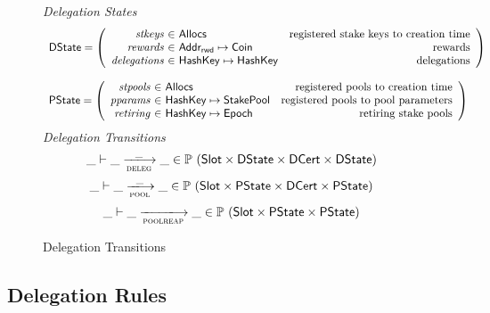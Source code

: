 \begin{figure}
  \emph{Delegation States}
  \begin{equation*}
    \begin{array}{l}
    \DState =
    \left(\begin{array}{r@{~\in~}lr}
      \var{stkeys} & \Allocs & \text{registered stake keys to creation time}\\
      \var{rewards} & \AddrRWD \mapsto \Coin & \text{rewards}\\
      \var{delegations} & \HashKey \mapsto \HashKey & \text{delegations}\\
    \end{array}\right)
    \\
    \\
    \PState =
    \left(\begin{array}{r@{~\in~}lr}
      \var{stpools} & \Allocs & \text{registered pools to creation time}\\
      \var{pparams} & \HashKey \mapsto \StakePool
        & \text{registered pools to pool parameters}\\
      \var{retiring} & \HashKey \mapsto \Epoch & \text{retiring stake pools}\\
    \end{array}\right)
    \end{array}
  \end{equation*}
  \emph{Delegation Transitions}
  \begin{equation*}
    \_ \vdash \_ \trans{deleg}{\_} \_ \in
      \powerset (\Slot \times \DState \times \DCert \times \DState)
  \end{equation*}
  \begin{equation*}
    \_ \vdash \_ \trans{pool}{\_} \_ \in
      \powerset (\Slot \times \PState \times \DCert \times \PState)
  \end{equation*}
  \begin{equation*}
    \_ \vdash \_ \trans{poolreap}{} \_ \in
    \powerset (\Slot \times \PState \times \PState)
  \end{equation*}
  \caption{Delegation Transitions}
  \label{fig:delegation-transitions}
\end{figure}


\subsection{Delegation Rules}
\label{sec:deleg-rules}


